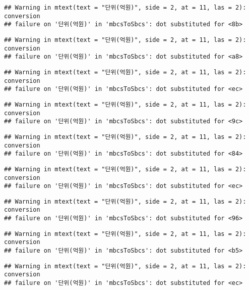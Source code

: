 \documentclass[
]{article}
\begin{document}
\begin{verbatim}
## Warning in mtext(text = "단위(억원)", side = 2, at = 11, las = 2): conversion
## failure on '단위(억원)' in 'mbcsToSbcs': dot substituted for <8b>
\end{verbatim}

\begin{verbatim}
## Warning in mtext(text = "단위(억원)", side = 2, at = 11, las = 2): conversion
## failure on '단위(억원)' in 'mbcsToSbcs': dot substituted for <a8>
\end{verbatim}

\begin{verbatim}
## Warning in mtext(text = "단위(억원)", side = 2, at = 11, las = 2): conversion
## failure on '단위(억원)' in 'mbcsToSbcs': dot substituted for <ec>
\end{verbatim}

\begin{verbatim}
## Warning in mtext(text = "단위(억원)", side = 2, at = 11, las = 2): conversion
## failure on '단위(억원)' in 'mbcsToSbcs': dot substituted for <9c>
\end{verbatim}

\begin{verbatim}
## Warning in mtext(text = "단위(억원)", side = 2, at = 11, las = 2): conversion
## failure on '단위(억원)' in 'mbcsToSbcs': dot substituted for <84>
\end{verbatim}

\begin{verbatim}
## Warning in mtext(text = "단위(억원)", side = 2, at = 11, las = 2): conversion
## failure on '단위(억원)' in 'mbcsToSbcs': dot substituted for <ec>
\end{verbatim}

\begin{verbatim}
## Warning in mtext(text = "단위(억원)", side = 2, at = 11, las = 2): conversion
## failure on '단위(억원)' in 'mbcsToSbcs': dot substituted for <96>
\end{verbatim}

\begin{verbatim}
## Warning in mtext(text = "단위(억원)", side = 2, at = 11, las = 2): conversion
## failure on '단위(억원)' in 'mbcsToSbcs': dot substituted for <b5>
\end{verbatim}

\begin{verbatim}
## Warning in mtext(text = "단위(억원)", side = 2, at = 11, las = 2): conversion
## failure on '단위(억원)' in 'mbcsToSbcs': dot substituted for <ec>
\end{verbatim}
\end{document}
